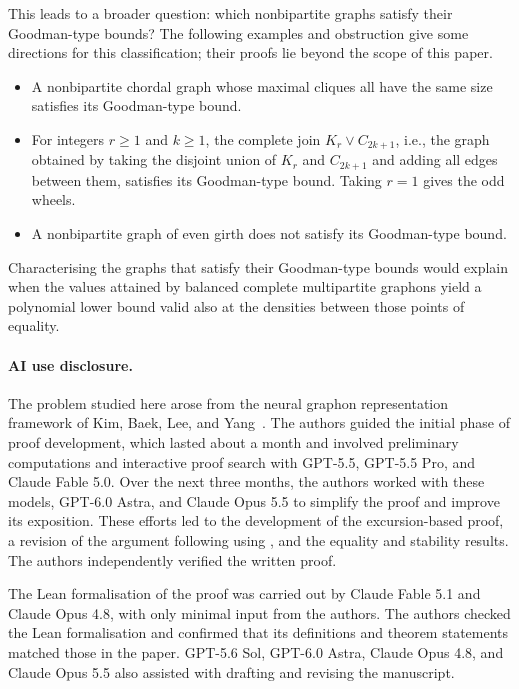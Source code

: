 \documentclass[11pt]{article}
\theoremstyle{remark}
\numberwithin{equation}{section}
\begin{document}
This leads to a broader question: which nonbipartite graphs satisfy their
Goodman-type bounds? The following examples and obstruction give some
directions for this classification; their proofs lie beyond the scope of
this paper.
\begin{itemize}
  \item A nonbipartite chordal graph whose maximal cliques all have the
  same size satisfies its Goodman-type bound. %
  \item For integers $r\ge1$ and $k\ge1$, the complete join
  $K_r\vee C_{2k+1}$, i.e., the graph obtained by taking the disjoint union of $K_r$ and $C_{2k+1}$ and adding all edges between them, satisfies its Goodman-type bound.  Taking $r=1$ gives the odd wheels.
  \item A nonbipartite graph of even girth does not satisfy its
  Goodman-type bound. 
\end{itemize}
Characterising the graphs that satisfy their Goodman-type bounds would
explain when the values attained by balanced complete multipartite graphons
yield a polynomial lower bound valid also at the densities between those
points of equality.

\paragraph{AI use disclosure.}
The problem studied here arose from the neural graphon representation
framework of Kim, Baek, Lee, and Yang~\cite{kim2026implicit}.
The authors guided the initial phase of proof development, which lasted
about a month and involved preliminary computations and interactive proof
search with GPT-5.5, GPT-5.5 Pro, and Claude Fable 5.0.
Over the next three months, the authors worked with these models,
GPT-6.0 Astra, and Claude Opus 5.5 to simplify the proof and improve its exposition.
These efforts led to the development of the excursion-based proof,
a revision of the argument following  using
, and the equality and stability results.
The authors independently verified the written proof.

The Lean formalisation of the proof was carried out by Claude Fable 5.1
and Claude Opus 4.8, with only minimal input from the authors.
The authors checked the Lean formalisation and confirmed that its definitions
and theorem statements matched those in the paper.
GPT-5.6 Sol, GPT-6.0 Astra, Claude Opus 4.8, and Claude Opus 5.5 also assisted with drafting and revising
the manuscript.
\end{document}
